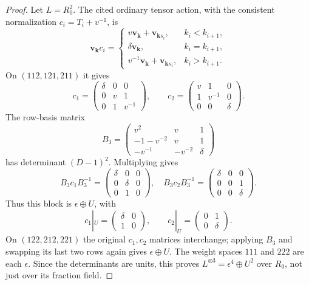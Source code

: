 \begin{proof}
Let $L=R_0^2$. The cited ordinary tensor action, with the consistent
normalization $c_i=T_i+v^{-1}$, is
\[
 \mathbf v_{\mathbf k}c_i=
 \begin{cases}
 v\mathbf v_{\mathbf k}+\mathbf v_{\mathbf k s_i},&k_i<k_{i+1},\\
 \delta\mathbf v_{\mathbf k},&k_i=k_{i+1},\\
 v^{-1}\mathbf v_{\mathbf k}+\mathbf v_{\mathbf k s_i},&k_i>k_{i+1}.
 \end{cases}
\]
On $(112,121,211)$ it gives
\[
 c_1=\begin{pmatrix}\delta&0&0\\0&v&1\\0&1&v^{-1}\end{pmatrix},\qquad
 c_2=\begin{pmatrix}v&1&0\\1&v^{-1}&0\\0&0&\delta\end{pmatrix}.
\]
The row-basis matrix
\[
 B_3=\begin{pmatrix}v^2&v&1\\-1-v^{-2}&v&1\\
                         -v^{-1}&-v^{-2}&\delta\end{pmatrix}
\]
has determinant $(D-1)^2$. Multiplying gives
\[
 B_3c_1B_3^{-1}=\begin{pmatrix}\delta&0&0\\0&\delta&0\\0&1&0\end{pmatrix},
 \quad
 B_3c_2B_3^{-1}=\begin{pmatrix}\delta&0&0\\0&0&1\\0&0&\delta\end{pmatrix}.
\]
Thus this block is $\epsilon\oplus U$, with
\[
 c_1|_U=\begin{pmatrix}\delta&0\\1&0\end{pmatrix},\qquad
 c_2|_U=\begin{pmatrix}0&1\\0&\delta\end{pmatrix}.
\]
On $(122,212,221)$ the original $c_1,c_2$ matrices interchange; applying
$B_3$ and swapping its last two rows again gives $\epsilon\oplus U$.
The weight spaces $111$ and $222$ are each $\epsilon$. Since the determinants
are units, this proves $L^{\otimes3}=\epsilon^4\oplus U^2$ over $R_0$,
not just over its fraction field.


\end{proof}
